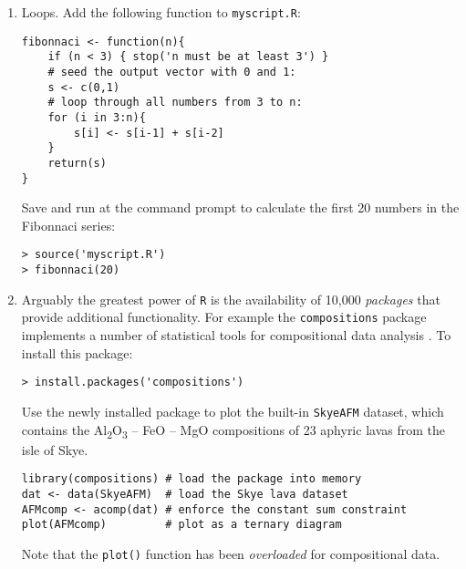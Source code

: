 \documentclass[11pt]{article}
\begin{document}
\begin{enumerate}
\item Loops. Add the following function to \texttt{myscript.R}:

\begin{verbatim}
fibonnaci <- function(n){
    if (n < 3) { stop('n must be at least 3') }
    # seed the output vector with 0 and 1:
    s <- c(0,1)
    # loop through all numbers from 3 to n:
    for (i in 3:n){
        s[i] <- s[i-1] + s[i-2]
    }
    return(s)
}
\end{verbatim}

Save and run at the command prompt to calculate the first 20 numbers
in the Fibonnaci series:

\begin{verbatim}
> source('myscript.R')
> fibonnaci(20)
\end{verbatim}

\item Arguably the greatest power of \texttt{R} is the availability of
  10,000 \textit{packages} that provide additional functionality. For
  example the \texttt{compositions} package implements a number of
  statistical tools for compositional data analysis
  \citep{vandenboogaart2008, vandenboogaart2013}.  To install this
  package:

\begin{verbatim}
> install.packages('compositions')
\end{verbatim}

Use the newly installed package to plot the built-in \texttt{SkyeAFM}
dataset, which contains the Al\textsubscript{2}O\textsubscript{3} --
FeO -- MgO compositions of 23 aphyric lavas from the isle of Skye.

\begin{verbatim}
library(compositions) # load the package into memory
dat <- data(SkyeAFM)  # load the Skye lava dataset
AFMcomp <- acomp(dat) # enforce the constant sum constraint
plot(AFMcomp)         # plot as a ternary diagram
\end{verbatim}

Note that the \texttt{plot()} function has been \textit{overloaded}
for compositional data.

\end{enumerate}
\end{document}
